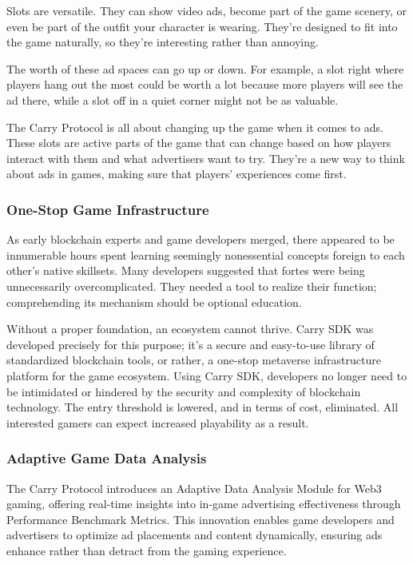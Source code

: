 Slots are versatile. They can show video ads, become part of the game scenery, or even be part of the outfit your character is wearing. They're designed to fit into the game naturally, so they're interesting rather than annoying.

The worth of these ad spaces can go up or down. For example, a slot right where players hang out the most could be worth a lot because more players will see the ad there, while a slot off in a quiet corner might not be as valuable.

The Carry Protocol is all about changing up the game when it comes to ads. These slots are active parts of the game that can change based on how players interact with them and what advertisers want to try. They're a new way to think about ads in games, making sure that players' experiences come first.


\subsubsection{One-Stop Game Infrastructure}

As early blockchain experts and game developers merged, there appeared to be innumerable hours spent learning seemingly nonessential concepts foreign to each other’s native skillsets. Many developers suggested that fortes were being unnecessarily overcomplicated. They needed a tool to realize their function; comprehending its mechanism should be optional education.

Without a proper foundation, an ecosystem cannot thrive. Carry SDK was developed precisely for this purpose; it’s a secure and easy-to-use library of standardized blockchain tools, or rather, a one-stop metaverse infrastructure platform for the game ecosystem. Using Carry SDK, developers no longer need to be intimidated or hindered by the security and complexity of blockchain technology. The entry threshold is lowered, and in terms of cost, eliminated. All interested gamers can expect increased playability as a result.


\subsubsection{Adaptive Game Data Analysis}
The Carry Protocol introduces an Adaptive Data Analysis Module for Web3 gaming, offering real-time insights into in-game advertising effectiveness through Performance Benchmark Metrics. This innovation enables game developers and advertisers to optimize ad placements and content dynamically, ensuring ads enhance rather than detract from the gaming experience.

